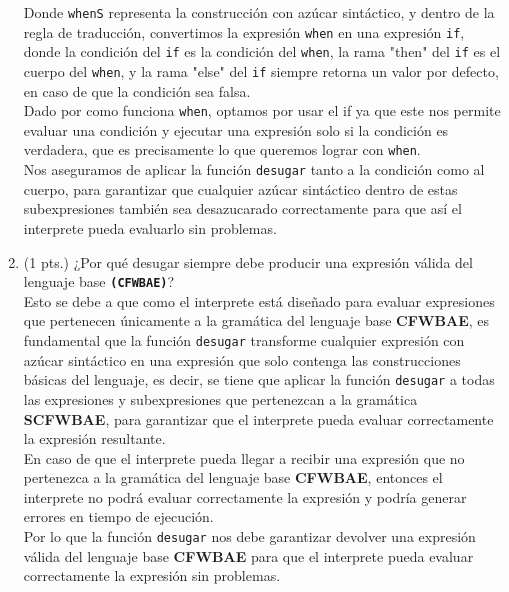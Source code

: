 \documentclass[11pt]{article}
\begin{document}
\begin{enumerate}
    Donde \texttt{whenS} representa la construcción con azúcar sintáctico, y dentro de la regla de traducción, convertimos la expresión \texttt{when} en una expresión \texttt{if}, donde la condición del \texttt{if} es la condición del \texttt{when}, la rama "then" del \texttt{if} es el cuerpo del \texttt{when}, y la rama "else" del \texttt{if} siempre retorna un valor por defecto, en caso de que la condición sea falsa.\\
    Dado por como funciona \texttt{when}, optamos por usar el if ya que este nos permite evaluar una condición y ejecutar una expresión solo si la condición es verdadera, que es precisamente lo que queremos lograr con \texttt{when}.\\
    Nos aseguramos de aplicar la función \texttt{desugar} tanto a la condición como al cuerpo, para garantizar que cualquier azúcar sintáctico dentro de estas subexpresiones también sea desazucarado correctamente para que así el interprete pueda evaluarlo sin problemas.

    \item (1 pts.) ¿Por qué desugar siempre debe producir una expresión válida del lenguaje base \texttt{\textbf{(CFWBAE)}}?\\
    Esto se debe a que como el interprete está diseñado para evaluar expresiones que pertenecen únicamente a la gramática del lenguaje base \textbf{CFWBAE}, es fundamental que la función \texttt{desugar} transforme cualquier expresión con azúcar sintáctico en una expresión que solo contenga las construcciones básicas del lenguaje, es decir, se tiene que aplicar la función \texttt{desugar} a todas las expresiones y subexpresiones que pertenezcan a la gramática \textbf{SCFWBAE}, para garantizar que el interprete pueda evaluar correctamente la expresión resultante.\\
    En caso de que el interprete pueda llegar a recibir una expresión que no pertenezca a la gramática del lenguaje base \textbf{CFWBAE}, entonces el interprete no podrá evaluar correctamente la expresión y podría generar errores en tiempo de ejecución.\\
    Por lo que la función \texttt{desugar} nos debe garantizar devolver una expresión válida del lenguaje base \textbf{CFWBAE} para que el interprete pueda evaluar correctamente la expresión sin problemas.


\end{enumerate}
\end{document}
